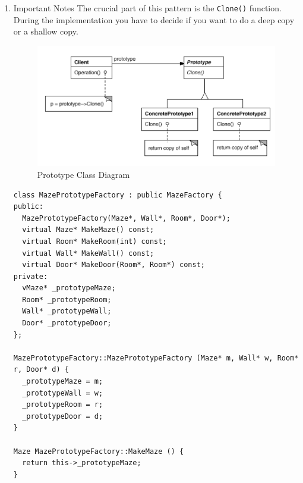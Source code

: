 \documentclass[11pt]{article}
\begin{document}
\begin{enumerate}
\item Important Notes
\label{sec:org9194bb4}
The crucial part of this pattern is the \texttt{Clone()} function.
During the implementation you have to decide if you want to do a deep copy or a shallow copy.


\begin{figure}[htbp]
\centering
\includegraphics[width=.9\linewidth]{img/prototype.png}
\caption{\label{fig:prototype-class-diagram}Prototype Class Diagram}
\end{figure}


\begin{lstlisting}
class MazePrototypeFactory : public MazeFactory {
public:
  MazePrototypeFactory(Maze*, Wall*, Room*, Door*);
  virtual Maze* MakeMaze() const;
  virtual Room* MakeRoom(int) const;
  virtual Wall* MakeWall() const;
  virtual Door* MakeDoor(Room*, Room*) const;
private:
  vMaze* _prototypeMaze;
  Room* _prototypeRoom;
  Wall* _prototypeWall;
  Door* _prototypeDoor;
};

MazePrototypeFactory::MazePrototypeFactory (Maze* m, Wall* w, Room* r, Door* d) {
  _prototypeMaze = m;
  _prototypeWall = w;
  _prototypeRoom = r;
  _prototypeDoor = d;
}

Maze MazePrototypeFactory::MakeMaze () {
  return this->_prototypeMaze;
}
\end{lstlisting}
\end{enumerate}
\end{document}
